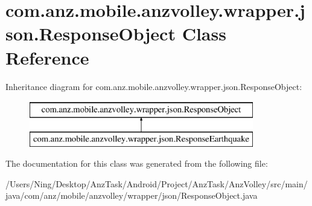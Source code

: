 \hypertarget{classcom_1_1anz_1_1mobile_1_1anzvolley_1_1wrapper_1_1json_1_1_response_object}{\section{com.\+anz.\+mobile.\+anzvolley.\+wrapper.\+json.\+Response\+Object Class Reference}
\label{classcom_1_1anz_1_1mobile_1_1anzvolley_1_1wrapper_1_1json_1_1_response_object}
}
Inheritance diagram for com.\+anz.\+mobile.\+anzvolley.\+wrapper.\+json.\+Response\+Object\+:\begin{figure}[H]
\begin{center}
\leavevmode
\includegraphics[height=2.000000cm]{classcom_1_1anz_1_1mobile_1_1anzvolley_1_1wrapper_1_1json_1_1_response_object}
\end{center}
\end{figure}


The documentation for this class was generated from the following file\+:\begin{DoxyCompactItemize}
\item 
/\+Users/\+Ning/\+Desktop/\+Anz\+Task/\+Android/\+Project/\+Anz\+Task/\+Anz\+Volley/src/main/java/com/anz/mobile/anzvolley/wrapper/json/Response\+Object.\+java\end{DoxyCompactItemize}
